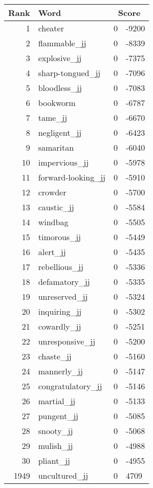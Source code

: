 \begin{longtable}[!htbp]{| rlr@{.}l |}
    \hline
    \textbf{Rank} & \textbf{Word} & \multicolumn{2}{c|}{\textbf{Score}} \\
    \hline
    \endhead
    1 & cheater & 0 & -9200 \\
    2 & flammable\_jj & 0 & -8339 \\
    3 & explosive\_jj & 0 & -7375 \\
    4 & sharp-tongued\_jj & 0 & -7096 \\
    5 & bloodless\_jj & 0 & -7083 \\
    6 & bookworm & 0 & -6787 \\
    7 & tame\_jj & 0 & -6670 \\
    8 & negligent\_jj & 0 & -6423 \\
    9 & samaritan & 0 & -6040 \\
    10 & impervious\_jj & 0 & -5978 \\
    11 & forward-looking\_jj & 0 & -5910 \\
    12 & crowder & 0 & -5700 \\
    13 & caustic\_jj & 0 & -5584 \\
    14 & windbag & 0 & -5505 \\
    15 & timorous\_jj & 0 & -5449 \\
    16 & alert\_jj & 0 & -5435 \\
    17 & rebellious\_jj & 0 & -5336 \\
    18 & defamatory\_jj & 0 & -5335 \\
    19 & unreserved\_jj & 0 & -5324 \\
    20 & inquiring\_jj & 0 & -5302 \\
    21 & cowardly\_jj & 0 & -5251 \\
    22 & unresponsive\_jj & 0 & -5200 \\
    23 & chaste\_jj & 0 & -5160 \\
    24 & mannerly\_jj & 0 & -5147 \\
    25 & congratulatory\_jj & 0 & -5146 \\
    26 & martial\_jj & 0 & -5133 \\
    27 & pungent\_jj & 0 & -5085 \\
    28 & snooty\_jj & 0 & -5068 \\
    29 & mulish\_jj & 0 & -4988 \\
    30 & pliant\_jj & 0 & -4955 \\
    1949 & uncultured\_jj & 0 & 4709 \\

\end{longtable}
